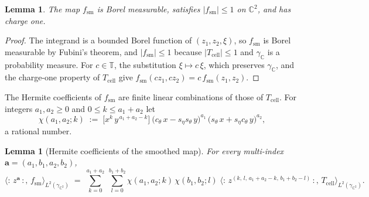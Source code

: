 \documentclass[11pt,reqno]{amsart}
\newtheorem{lemma}[theorem]{Lemma}
\theoremstyle{definition}
\numberwithin{equation}{section}
\newcommand{\C}{\mathbb{C}}
\newcommand{\T}{\mathbb{T}}
\newcommand{\gC}{\gamma_{\C}}
\newcommand{\gCC}{\gamma_{\C^2}}
\newcommand{\wick}[1]{{:}\,#1\,{:}}
\newcommand{\Tcell}{T_{\mathrm{cell}}}
\newcommand{\fsm}{f_{\mathrm{sm}}}
\begin{document}
\begin{lemma}\label{lem:smooth-basic}
The map $\fsm$ is Borel measurable, satisfies $|\fsm|\le1$ on $\C^2$, and has charge one.
\end{lemma}

\begin{proof}
The integrand is a bounded Borel function of $(z_1,z_2,\xi)$, so $\fsm$ is Borel measurable by Fubini's theorem, and $|\fsm|\le1$ because $|\Tcell|\le1$ and $\gC$ is a probability measure. For $c\in\T$, the substitution $\xi\mapsto c\,\xi$, which preserves $\gC$, and the charge-one property of $\Tcell$ give $\fsm(cz_1,cz_2)=c\,\fsm(z_1,z_2)$.
\end{proof}

The Hermite coefficients of $\fsm$ are finite linear combinations of those of $\Tcell$. For integers $a_1,a_2\ge0$ and $0\le k\le a_1+a_2$ let
\begin{equation}\label{eq:beta-def}
  \chi(a_1,a_2;k)\;:=\;\bigl[x^k\,y^{\,a_1+a_2-k}\bigr]\ \bigl(c_\theta\,x-s_\eta s_\theta\,y\bigr)^{a_1}\,\bigl(s_\theta\,x+s_\eta c_\theta\,y\bigr)^{a_2},
\end{equation}
a rational number.

\begin{lemma}[Hermite coefficients of the smoothed map]\label{lem:smooth-hermite}
For every multi-index $\mathbf{a}=(a_1,b_1,a_2,b_2)$,
\[
  \bigl\langle \wick{z^{\mathbf{a}}},\,\fsm\bigr\rangle_{L^2(\gCC)}
  \;=\;\sum_{k=0}^{a_1+a_2}\ \sum_{l=0}^{b_1+b_2}\chi(a_1,a_2;k)\,\chi(b_1,b_2;l)\;
  \bigl\langle \wick{z^{(k,\,l,\,a_1+a_2-k,\,b_1+b_2-l)}},\,\Tcell\bigr\rangle_{L^2(\gCC)} .
\]
\end{lemma}
\end{document}

